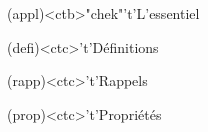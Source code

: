 \documentclass[../../main/main.tex]{subfiles}
\begin{document}
\begin{tcn}[%
		sidebyside, fontupper=\small, fontlower=\small
	](appl)<ctb>"chek"'t'{L'essentiel}
	\begin{tcn}[nsp](defi)<ctc>'t'{Définitions}
		\vspace{-25pt}
	\end{tcn}
	\begin{tcn}[nsp](rapp)<ctc>'t'{Rappels}
		\vspace{-25pt}
	\end{tcn}
	\begin{tcn}[nsp](prop)<ctc>'t'{Propriétés}
		\vspace{-25pt}
	\end{tcn}

\end{tcn}
\end{document}
